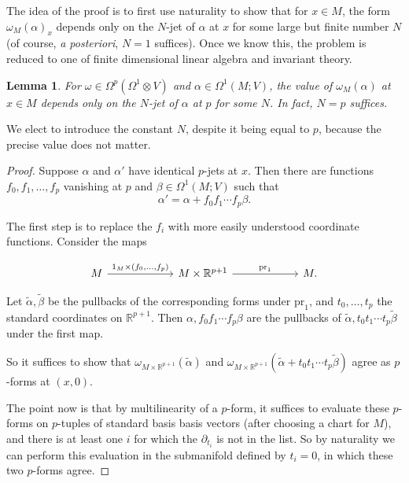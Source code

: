 \documentclass{shortart}
\newtheorem{lemma}[thm]{Lemma}
\theoremstyle{definition}
\newcommand\R{\mathbb{R}}
\newcommand\pr{\mathrm{pr}}
\begin{document}
The idea of the proof is to first use naturality to show that for $x \in M$, the form $\omega_M(\alpha)_x$ depends only on the $N$-jet of $\alpha$ at $x$ for some large but finite number $N$ (of course, \emph{a posteriori}, $N = 1$ suffices). Once we know this, the problem is reduced to one of finite dimensional linear algebra and invariant theory.

\begin{lemma}
  For $\omega \in \Omega^p(\Omega^1 \otimes V)$ and $\alpha \in \Omega^1(M; V)$, the value of $\omega_M(\alpha)$ at $x \in M$ depends only on the $N$-jet of $\alpha$ at $p$ for some $N$. In fact, $N = p$ suffices.
\end{lemma}
We elect to introduce the constant $N$, despite it being equal to $p$, because the precise value does not matter.

\begin{proof}
  Suppose $\alpha$ and $\alpha'$ have identical $p$-jets at $x$. Then there are functions $f_0, f_1, \ldots, f_p$ vanishing at $p$ and $\beta \in \Omega^1(M; V)$ such that
  \[
    \alpha' = \alpha + f_0 f_1 \cdots f_p \beta.
  \]

  The first step is to replace the $f_i$ with more easily understood coordinate functions. Consider the maps
  \begin{useimager}
    \[
      \begin{tikzcd}[column sep=6em]
        M \ar[r, "{1_M \times (f_0, \ldots, f_p)}"] & M \times \R^{p + 1} \ar[r, "\mathrm{pr}_1"] & M.
      \end{tikzcd}
    \]
  \end{useimager}%
  Let $\tilde{\alpha}, \tilde{\beta}$ be the pullbacks of the corresponding forms under $\pr_1$, and $t_0, \ldots, t_p$ the standard coordinates on $\R^{p + 1}$. Then $\alpha, f_0 f_1\cdots f_p \beta$ are the pullbacks of $\tilde{\alpha}, t_0 t_1\cdots t_p \tilde{\beta}$ under the first map.

  So it suffices to show that $\omega_{M \times \R^{p + 1}}(\tilde{\alpha})$ and $\omega_{M \times \R^{p + 1}}(\tilde{\alpha} + t_0 t_1 \cdots t_p \tilde{\beta})$ agree as $p$-forms at $(x, 0)$.

  The point now is that by multilinearity of a $p$-form, it suffices to evaluate these $p$-forms on $p$-tuples of standard basis basis vectors (after choosing a chart for $M$), and there is at least one $i$ for which the $\partial_{t_i}$ is not in the list. So by naturality we can perform this evaluation in the submanifold defined by $t_i = 0$, in which these two $p$-forms agree. 
\end{proof}
\end{document}
